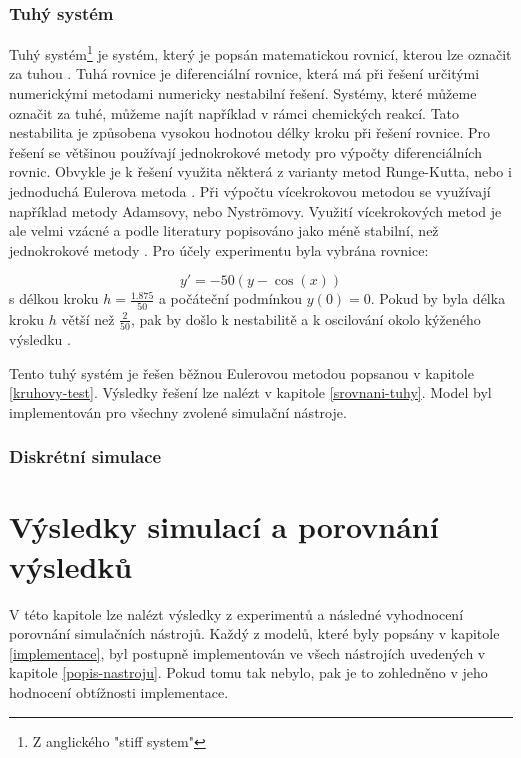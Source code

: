 \subsection{Tuhý systém}
Tuhý systém\footnote{Z anglického "stiff system"} je systém, který je popsán matematickou rovnicí, kterou lze označit za tuhou \cite{hairer}. Tuhá rovnice je diferenciální rovnice, která má při řešení určitými numerickými metodami numericky nestabilní řešení. Systémy, které můžeme označit za tuhé, můžeme najít například v rámci chemických reakcí. Tato nestabilita je způsobena vysokou hodnotou délky kroku při řešení rovnice. Pro řešení se většinou používají jednokrokové metody pro výpočty diferenciálních rovnic. Obvykle je k řešení využita některá z varianty metod Runge-Kutta, nebo i jednoduchá Eulerova metoda \cite{IMS-skripta}. Při výpočtu vícekrokovou metodou se využívají například metody Adamsovy, nebo Nyströmovy. Využití vícekrokových metod je ale velmi vzácné a podle literatury popisováno jako méně stabilní, než jednokrokové metody \cite{hairer}. Pro účely experimentu byla vybrána rovnice:

\begin{equation}
    y' = -50(y - \cos{(x)})
\end{equation}
s délkou kroku $h = \frac{1.875}{50}$ a počáteční podmínkou $y(0) = 0$. Pokud by byla délka kroku $h$ větší než $\frac{2}{50}$, pak by došlo k nestabilitě a k oscilování okolo kýženého výsledku \cite{hairer}.


Tento tuhý systém je řešen běžnou Eulerovou metodou popsanou v kapitole \ref{kruhovy-test}. Výsledky řešení lze nalézt v kapitole \ref{srovnani-tuhy}. Model byl implementován pro všechny zvolené simulační nástroje.

\subsection{Diskrétní simulace}

\chapter{Výsledky simulací a porovnání výsledků}
\label{kapitola5}
V této kapitole lze nalézt výsledky z experimentů a následné vyhodnocení porovnání simulačních nástrojů. Každý z modelů, které byly popsány v kapitole \ref{implementace}, byl postupně implementován ve všech nástrojích uvedených v kapitole \ref{popis-nastroju}. Pokud tomu tak nebylo, pak je to zohledněno v jeho hodnocení obtížnosti implementace.

